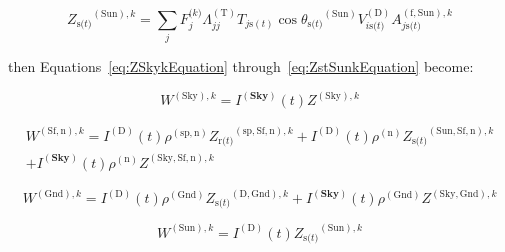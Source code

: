 \begin{equation}
{Z_{{\mathrm{s(}}t{\mathrm{)}}}}^{{\mathrm{(Sun)}},k} = \sum\limits_j {F_j^{{\mathrm{(}}k{\mathrm{)}}}\Lambda_{jj}^{{\mathrm{(T)}}}{T_{j{\mathrm{ s}}(t)}}\cos {\theta_{{\mathrm{s(}}t{\mathrm{)}}}}^{{\mathrm{(Sun)}}}V_{i{\mathrm{ s(}}t{\mathrm{)}}}^{{\mathrm{(D)}}}A_{j{\mathrm{ s(}}t{\mathrm{)}}}^{{\mathrm{(f, Sun), }}k}}
\label{eq:ZstSunkEquation}
\end{equation}

then Equations~\ref{eq:ZSkykEquation} through~\ref{eq:ZstSunkEquation} become:

\begin{equation}
{W^{{\mathrm{(Sky), }}k}} = {I^{({\mathbf{Sky}})}}(t){Z^{{\mathrm{(Sky), }}k}}
\label{eq:WSkykEquation}
\end{equation}

\begin{equation}
\begin{array}{c}{W^{{\mathrm{(Sf,n)}},k}} = {I^{{\mathrm{(D)}}}}(t){\rho ^{{\mathrm{(sp, n)}}}}{Z_{{\mathrm{r(}}t{\mathrm{)}}}}^{{\mathrm{(sp, Sf, n)}},k} + {I^{{\mathrm{(D)}}}}(t){\rho ^{{\mathrm{(n)}}}}{Z_{{\mathrm{s(}}t{\mathrm{)}}}}^{{\mathrm{(Sun, Sf, n)}},k}\\ + {I^{({\mathbf{Sky}})}}(t){\rho ^{{\mathrm{(n)}}}}{Z^{{\mathrm{(Sky, Sf, n)}},k}}\end{array}
\end{equation}

\begin{equation}
{W^{{\mathrm{(Gnd)}},k}} = {I^{{\mathrm{(D)}}}}(t){\rho ^{{\mathrm{(Gnd)}}}}{Z_{{\mathrm{s(}}t{\mathrm{)}}}}^{{\mathrm{(D, Gnd)}},k} + {I^{({\mathbf{Sky}})}}(t){\rho ^{{\mathrm{(Gnd)}}}}{Z^{{\mathrm{(Sky, Gnd)}},k}}
\end{equation}

\begin{equation}
{W^{{\mathrm{(Sun)}},k}} = {I^{{\mathrm{(D)}}}}(t){Z_{{\mathrm{s(}}t{\mathrm{)}}}}^{{\mathrm{(Sun)}},k}
\label{eq:WSunkEquation}
\end{equation}

